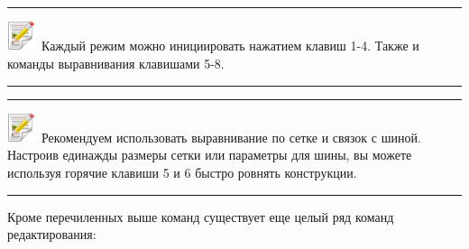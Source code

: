\hrule
\smallskip
\noindent\includegraphics[width=25pt, height=25pt]{../images/note.png} \textcolor[rgb]{.67,.05,.05}{Каждый режим можно инициировать нажатием клавиш 1-4. Также и команды выравнивания клавишами 5-8.}
\smallskip
\hrule
\smallskip
\hrule
\smallskip
\noindent\includegraphics[width=25pt, height=25pt]{../images/note.png} \textcolor[rgb]{.67,.05,.05}{Рекомендуем использовать выравнивание по сетке и связок с шиной. Настроив единажды размеры сетки или параметры для шины, вы можете используя горячие клавиши 5 и 6 быстро ровнять конструкции.}
\smallskip
\hrule
\medskip
Кроме перечиленных выше команд существует еще целый ряд команд редактирования:
